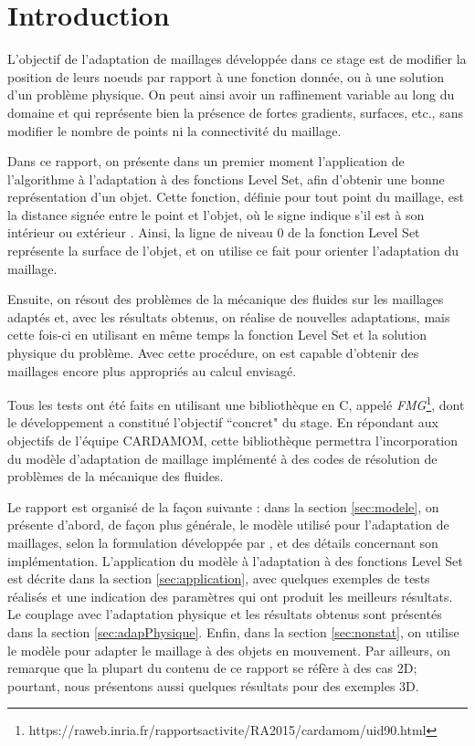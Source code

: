 \section{Introduction}

\indent L'objectif de l'adaptation de maillages développée dans ce stage est de modifier la position de leurs noeuds par rapport à une fonction donnée, ou à une solution d'un problème physique. On peut ainsi avoir un raffinement variable au long du domaine et qui représente bien la présence de fortes gradients, surfaces, etc., sans modifier le nombre de points ni la connectivité du maillage.

\indent Dans ce rapport, on présente dans un premier moment l'application de l'algorithme à l'adaptation à des fonctions Level Set, afin d'obtenir une bonne représentation d'un objet. Cette fonction, définie pour tout point du maillage, est la distance signée entre le point et l'objet, où le signe indique s'il est à son intérieur ou extérieur \cite{ducrot}. Ainsi, la ligne de niveau 0 de la fonction Level Set représente la surface de l'objet, et on utilise ce fait pour orienter l'adaptation du maillage.

\indent Ensuite, on résout des problèmes de la mécanique des fluides sur les maillages adaptés et, avec les résultats obtenus, on réalise de nouvelles adaptations, mais cette fois-ci en utilisant en même temps la fonction Level Set et la solution physique du problème. Avec cette procédure, on est capable d'obtenir des maillages encore plus appropriés au calcul envisagé.

\indent Tous les tests ont été faits en utilisant une bibliothèque en C, appelé \emph{FMG}\footnote{https://raweb.inria.fr/rapportsactivite/RA2015/cardamom/uid90.html}, dont le développement a constitué l'objectif ``concret" du stage. En répondant aux objectifs de l'équipe CARDAMOM, cette bibliothèque permettra l'incorporation du modèle d'adaptation de maillage implémenté à des codes de résolution de problèmes de la mécanique des fluides. 

\indent Le rapport est organisé de la façon suivante : dans la section \ref{sec:modele}, on présente d'abord, de façon plus générale, le modèle utilisé pour l'adaptation de maillages, selon la formulation développée par \cite{arpaia}, et des détails concernant son implémentation. L'application du modèle à l'adaptation à des fonctions Level Set est décrite dans la section \ref{sec:application}, avec quelques exemples de tests réalisés et une indication des paramètres qui ont produit les meilleurs résultats. Le couplage avec l'adaptation physique et les résultats obtenus sont présentés dans la section \ref{sec:adapPhysique}. Enfin, dans la section \ref{sec:nonstat}, on utilise le modèle pour adapter le maillage à des objets en mouvement. Par ailleurs, on remarque que la plupart du contenu de ce rapport se réfère à des cas 2D; pourtant, nous présentons aussi quelques résultats pour des exemples 3D.

